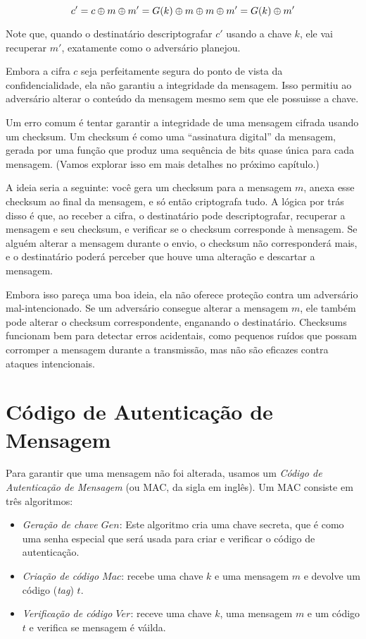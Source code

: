 \begin{displaymath}
c' = c \oplus m \oplus m' = G(k) \oplus m \oplus m \oplus m' = G(k) \oplus m'
\end{displaymath}

Note que, quando o destinatário descriptografar $c'$ usando a chave $k$, ele vai recuperar $m'$, exatamente como o adversário planejou.

Embora a cifra $c$ seja perfeitamente segura do ponto de vista da confidencialidade, ela não garantiu a integridade da mensagem.
Isso permitiu ao adversário alterar o conteúdo da mensagem mesmo sem que ele possuisse a chave.

Um erro comum é tentar garantir a integridade de uma mensagem cifrada usando um checksum. Um checksum é como uma ``assinatura digital'' da mensagem, gerada por uma função que produz uma sequência de bits quase única para cada mensagem.
(Vamos explorar isso em mais detalhes no próximo capítulo.)

A ideia seria a seguinte: você gera um checksum para a mensagem $m$, anexa esse checksum ao final da mensagem, e só então criptografa tudo.
A lógica por trás disso é que, ao receber a cifra, o destinatário pode descriptografar, recuperar a mensagem e seu checksum, e verificar se o checksum corresponde à mensagem.
Se alguém alterar a mensagem durante o envio, o checksum não corresponderá mais, e o destinatário poderá perceber que houve uma alteração e descartar a mensagem.

Embora isso pareça uma boa ideia, ela não oferece proteção contra um adversário mal-intencionado.
Se um adversário consegue alterar a mensagem $m$, ele também pode alterar o checksum correspondente, enganando o destinatário.
Checksums funcionam bem para detectar erros acidentais, como pequenos ruídos que possam corromper a mensagem durante a transmissão, mas não são eficazes contra ataques intencionais.

\section{Código de Autenticação de Mensagem}
\label{sec:mac}

Para garantir que uma mensagem não foi alterada, usamos um {\em Código de Autenticação de Mensagem} (ou MAC, da sigla em inglês).
Um MAC consiste em três algoritmos:

\begin{itemize}
\item {\em Geração de chave $Gen$}: Este algoritmo cria uma chave secreta, que é como uma senha especial que será usada para criar e verificar o código de autenticação.
\item {\em Criação de código $Mac$}: recebe uma chave $k$ e uma mensagem $m$ e devolve um código ({\em tag}) $t$.
\item {\em Verificação de código $Ver$}: receve uma chave $k$, uma mensagem $m$ e um código $t$ e verifica se mensagem é váilda.
\end{itemize}

